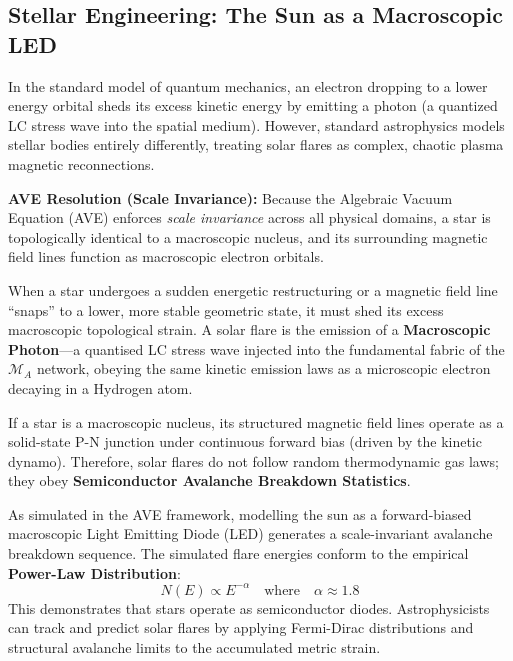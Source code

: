 \subsection{Stellar Engineering: The Sun as a Macroscopic LED}
In the standard model of quantum mechanics, an electron dropping to a lower energy orbital sheds its excess kinetic energy by emitting a photon (a quantized LC stress wave into the spatial medium). However, standard astrophysics models stellar bodies entirely differently, treating solar flares as complex, chaotic plasma magnetic reconnections.

\textbf{AVE Resolution (Scale Invariance):} Because the Algebraic Vacuum Equation (AVE) enforces \textit{scale invariance} across all physical domains, a star is topologically identical to a macroscopic nucleus, and its surrounding magnetic field lines function as macroscopic electron orbitals.

When a star undergoes a sudden energetic restructuring or a magnetic field line ``snaps'' to a lower, more stable geometric state, it must shed its excess macroscopic topological strain. A solar flare is the emission of a \textbf{Macroscopic Photon}---a quantised LC stress wave injected into the fundamental fabric of the $\mathcal{M}_A$ network, obeying the same kinetic emission laws as a microscopic electron decaying in a Hydrogen atom.

If a star is a macroscopic nucleus, its structured magnetic field lines operate as a solid-state P-N junction under continuous forward bias (driven by the kinetic dynamo). Therefore, solar flares do not follow random thermodynamic gas laws; they obey \textbf{Semiconductor Avalanche Breakdown Statistics}. 

As simulated in the AVE framework, modelling the sun as a forward-biased macroscopic Light Emitting Diode (LED) generates a scale-invariant avalanche breakdown sequence. The simulated flare energies conform to the empirical \textbf{Power-Law Distribution}:
\begin{equation}
    N(E) \propto E^{-\alpha} \quad \text{where} \quad \alpha \approx 1.8
\end{equation}
This demonstrates that stars operate as semiconductor diodes. Astrophysicists can track and predict solar flares by applying Fermi-Dirac distributions and structural avalanche limits to the accumulated metric strain.

